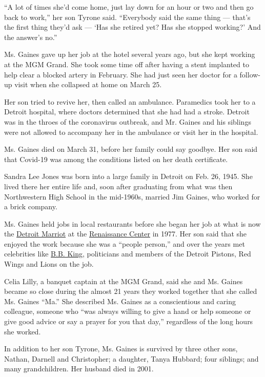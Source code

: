 ``A lot of times she'd come home, just lay down for an hour or two and
then go back to work,'' her son Tyrone said. ``Everybody said the same
thing --- that's the first thing they'd ask --- `Has she retired yet?
Has she stopped working?' And the answer's no.''

Ms. Gaines gave up her job at the hotel several years ago, but she kept
working at the MGM Grand. She took some time off after having a stent
implanted to help clear a blocked artery in February. She had just seen
her doctor for a follow-up visit when she collapsed at home on March 25.

Her son tried to revive her, then called an ambulance. Paramedics took
her to a Detroit hospital, where doctors determined that she had had a
stroke. Detroit was in the throes of the coronavirus outbreak, and Mr.
Gaines and his siblings were not allowed to accompany her in the
ambulance or visit her in the hospital.

Ms. Gaines died on March 31, before her family could say goodbye. Her
son said that Covid-19 was among the conditions listed on her death
certificate.

Sandra Lee Jones was born into a large family in Detroit on Feb. 26,
1945. She lived there her entire life and, soon after graduating from
what was then Northwestern High School in the mid-1960s, married Jim
Gaines, who worked for a brick company.

Ms. Gaines held jobs in local restaurants before she began her job at
what is now the
\href{https://www.marriott.com/hotels/travel/dtwdt-detroit-marriott-at-the-renaissance-center/}{Detroit
Marriot} at the
\href{https://en.wikipedia.org/wiki/Renaissance_Center}{Renaissance
Center} in 1977. Her son said that she enjoyed the work because she was
a ``people person,'' and over the years met celebrities like
\href{https://www.nytimes.com/2015/05/16/arts/music/b-b-king-blues-singer-dies-at-89.html}{B.B.
King}, politicians and members of the Detroit Pistons, Red Wings and
Lions on the job.

Celia Lilly, a banquet captain at the MGM Grand, said she and Ms. Gaines
became so close during the almost 21 years they worked together that she
called Ms. Gaines ``Ma.'' She described Ms. Gaines as a conscientious
and caring colleague, someone who ``was always willing to give a hand or
help someone or give good advice or say a prayer for you that day,''
regardless of the long hours she worked.

In addition to her son Tyrone, Ms. Gaines is survived by three other
sons, Nathan, Darnell and Christopher; a daughter, Tanya Hubbard; four
siblings; and many grandchildren. Her husband died in 2001.

